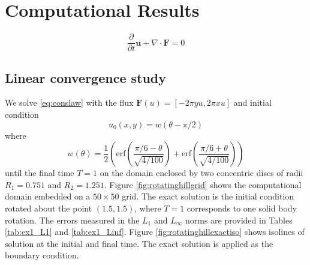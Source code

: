 \section{Computational Results}\label{compResults}
\begin{equation} \label{eq:conslaw}
   \frac{\partial}{\partial t} \mathbf{u} + \nabla \cdot \mathbf{F} = 0
\end{equation}
\subsection{Linear convergence study}
We solve \eqref{eq:conslaw} with the flux $\mathbf{F}(u) = [-2\pi y u, 2\pi x u]$ and initial condition
$$
u_0(x,y) = w(\theta - \pi/2)
$$
where
$$
w(\theta) = \frac{1}{2}\left( \text{erf}\left( \frac{\pi/6 - \theta}{\sqrt{4/100}} \right) + \text{erf}\left( \frac{\pi/6 + \theta}{\sqrt{4/100}} \right)\right)
$$
until the final time $T = 1$ on the domain enclosed by two concentric discs of radii $R_1 = 0.751$ and $R_2 = 1.251$.  Figure \ref{fig:rotatinghillgrid} shows the computational domain embedded on a $50 \times 50$ grid.  The exact solution is the initial condition rotated about the point $(1.5,1.5)$, where $T=1$ corresponds to one solid body rotation.  The errors measured in the $L_1$ and $L_\infty$ norms are provided in Tables \ref{tab:ex1_L1} and \ref{tab:ex1_Linf}.
Figure
\ref{fig:rotatinghillexactiso} shows isolines of solution at the initial and final time.  The exact solution is applied as the boundary condition.

